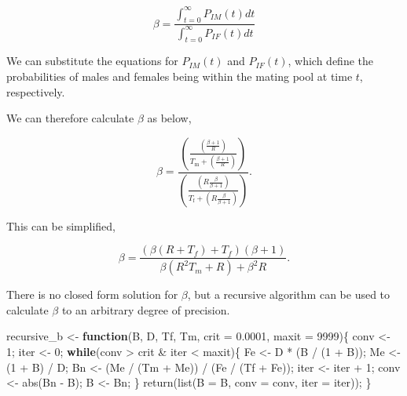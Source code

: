 \documentclass[
]{article}
\newenvironment{Shaded}{\begin{snugshade}}{\end{snugshade}}
\newcommand{\AttributeTok}[1]{\textcolor[rgb]{0.77,0.63,0.00}{#1}}
\newcommand{\ControlFlowTok}[1]{\textcolor[rgb]{0.13,0.29,0.53}{\textbf{#1}}}
\newcommand{\DecValTok}[1]{\textcolor[rgb]{0.00,0.00,0.81}{#1}}
\newcommand{\FloatTok}[1]{\textcolor[rgb]{0.00,0.00,0.81}{#1}}
\newcommand{\FunctionTok}[1]{\textcolor[rgb]{0.00,0.00,0.00}{#1}}
\newcommand{\NormalTok}[1]{#1}
\newcommand{\OtherTok}[1]{\textcolor[rgb]{0.56,0.35,0.01}{#1}}
\newcommand{\SpecialCharTok}[1]{\textcolor[rgb]{0.00,0.00,0.00}{#1}}
\begin{document}
\[\beta = \frac{\int_{t=0}^{\infty}P_{IM}(t)dt}{\int_{t=0}^{\infty}P_{IF}(t)dt}\]

We can substitute the equations for \(P_{IM}(t)\) and \(P_{IF}(t)\),
which define the probabilities of males and females being within the
mating pool at time \(t\), respectively.

We can therefore calculate \(\beta\) as below,

\[\beta = \frac{\left( \frac{\left(\frac{\beta + 1}{R}\right)}{T_{\mathrm{m}} + \left(\frac{\beta + 1}{R}\right)} \right)}{\left( \frac{\left(R \frac{\beta}{\beta + 1}\right)}{T_{\mathrm{f}} + \left(R \frac{\beta}{\beta + 1}\right)} \right)}.\]

This can be simplified,

\[\beta = \frac{\left(\beta\left(R + T_{f}\right) + T_{f}\right)\left(\beta + 1\right)}{\beta \left(R^{2}T_{m} + R\right) + \beta^{2}R}.\]

There is no closed form solution for \(\beta\), but a recursive
algorithm can be used to calculate \(\beta\) to an arbitrary degree of
precision.

\begin{Shaded}
\begin{Highlighting}[]
\NormalTok{recursive\_b }\OtherTok{\textless{}{-}} \ControlFlowTok{function}\NormalTok{(B, D, Tf, Tm, }\AttributeTok{crit =} \FloatTok{0.0001}\NormalTok{, }\AttributeTok{maxit =} \DecValTok{9999}\NormalTok{)\{}
\NormalTok{  conv }\OtherTok{\textless{}{-}} \DecValTok{1}\NormalTok{;}
\NormalTok{  iter }\OtherTok{\textless{}{-}} \DecValTok{0}\NormalTok{;}
  \ControlFlowTok{while}\NormalTok{(conv }\SpecialCharTok{\textgreater{}}\NormalTok{ crit }\SpecialCharTok{\&}\NormalTok{ iter }\SpecialCharTok{\textless{}}\NormalTok{ maxit)\{}
\NormalTok{    Fe   }\OtherTok{\textless{}{-}}\NormalTok{ D }\SpecialCharTok{*}\NormalTok{ (B }\SpecialCharTok{/}\NormalTok{ (}\DecValTok{1} \SpecialCharTok{+}\NormalTok{ B));}
\NormalTok{    Me   }\OtherTok{\textless{}{-}}\NormalTok{ (}\DecValTok{1} \SpecialCharTok{+}\NormalTok{ B) }\SpecialCharTok{/}\NormalTok{ D;}
\NormalTok{    Bn   }\OtherTok{\textless{}{-}}\NormalTok{ (Me }\SpecialCharTok{/}\NormalTok{ (Tm }\SpecialCharTok{+}\NormalTok{ Me)) }\SpecialCharTok{/}\NormalTok{ (Fe }\SpecialCharTok{/}\NormalTok{ (Tf }\SpecialCharTok{+}\NormalTok{ Fe));}
\NormalTok{    iter }\OtherTok{\textless{}{-}}\NormalTok{ iter }\SpecialCharTok{+} \DecValTok{1}\NormalTok{;}
\NormalTok{    conv }\OtherTok{\textless{}{-}} \FunctionTok{abs}\NormalTok{(Bn }\SpecialCharTok{{-}}\NormalTok{ B);}
\NormalTok{    B    }\OtherTok{\textless{}{-}}\NormalTok{ Bn;}
\NormalTok{  \}}
  \FunctionTok{return}\NormalTok{(}\FunctionTok{list}\NormalTok{(}\AttributeTok{B =}\NormalTok{ B, }\AttributeTok{conv =}\NormalTok{ conv, }\AttributeTok{iter =}\NormalTok{ iter));}
\NormalTok{\}}
\end{Highlighting}
\end{Shaded}
\end{document}
